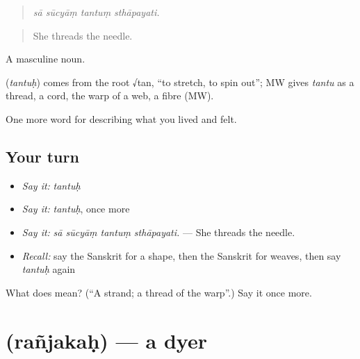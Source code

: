 \begin{quote}
   
\end{quote}

\begin{quote}
\emph{sā sūcyāṃ tantuṃ sthāpayati.}
\end{quote}

\begin{quote}
She threads the needle.
\end{quote}

A masculine noun.

\begin{cousinweb}
\textbf{} (\emph{tantuḥ}) comes from the root √tan, \textquotedblleft{}to stretch, to spin out\textquotedblright{}; MW gives \emph{tantu} as a thread, a cord, the warp of a web, a fibre (MW).
\end{cousinweb}

\begin{grammarlens}[title={What you've built}]
One more word for describing what you lived and felt.
\end{grammarlens}

\subsection*{Your turn}
\begin{itemize}
\raggedright
  \item \emph{Say it:} \emph{tantuḥ}
  \item \emph{Say it:} \emph{tantuḥ}, once more
  \item \emph{Say it:} \emph{sā sūcyāṃ tantuṃ sthāpayati.} — She threads the needle.
  \item \emph{Recall:} say the Sanskrit for a shape, then the Sanskrit for weaves, then say \emph{tantuḥ} again
\end{itemize}

\begin{tcolorbox}[breakable,colback=teal!4,colframe=teal!35!black,title={Before you move on}]
What does  mean? (\textquotedblleft{}A strand; a thread of the warp\textquotedblright{}.) Say it once more.
\end{tcolorbox}
\section[\texorpdfstring{\sk{रञ्जकः} (rañjakaḥ)}{रञ्जकः (rañjakaḥ)}]{ (rañjakaḥ) — a dyer}

